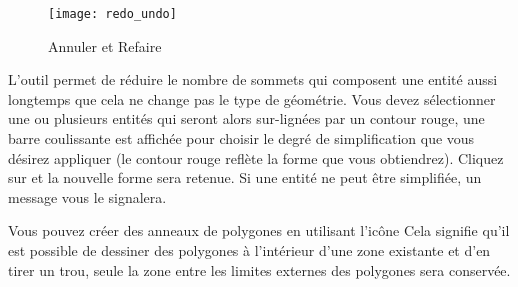 \begin{figure}[ht]
   \begin{center}   
   \texttt{[image: redo\_undo]}
   \caption{Annuler et Refaire \nixcaption}\label{fig:vector_redoundo}
\end{center}
\end{figure}


L'outil  permet de réduire le nombre de sommets qui composent une entité aussi longtemps que cela ne change pas le type de géométrie. Vous devez sélectionner une ou plusieurs entités qui seront alors sur-lignées par un contour rouge, une barre coulissante est affichée pour choisir le degré de simplification que vous désirez appliquer (le contour rouge reflète la forme que vous obtiendrez). Cliquez sur  et la nouvelle forme sera retenue. Si une entité ne peut être simplifiée, un message vous le signalera.



Vous pouvez créer des anneaux de polygones en utilisant l'icône  Cela signifie qu'il est possible de dessiner des polygones à l'intérieur d'une zone existante et d'en tirer un trou,  seule la zone entre les limites externes des polygones sera conservée.


